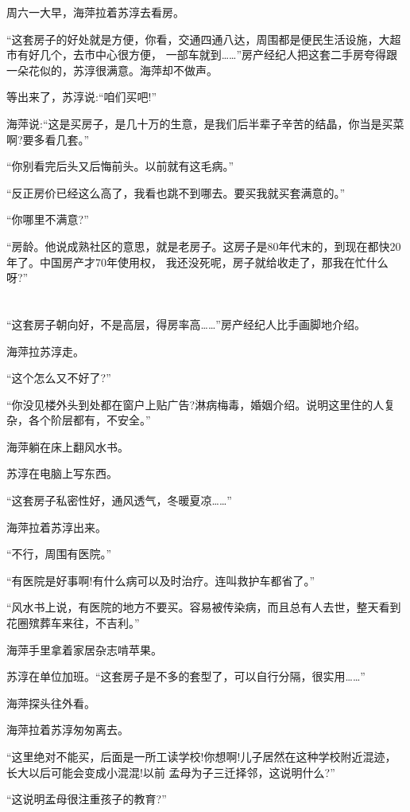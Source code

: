 \documentclass[11pt,a4paper,onecolumn]{article}
\begin{document}
周六一大早，海萍拉着苏淳去看房。

``这套房子的好处就是方便，你看，交通四通八达，周围都是便民生活设施，大超市有好几个，去市中心很方便，
一部车就到……''房产经纪人把这套二手房夸得跟一朵花似的，苏淳很满意。海萍却不做声。

等出来了，苏淳说:``咱们买吧!''

海萍说:``这是买房子，是几十万的生意，是我们后半辈子辛苦的结晶，你当是买菜啊?要多看几套。''

``你别看完后头又后悔前头。以前就有这毛病。''

``反正房价已经这么高了，我看也跳不到哪去。要买我就买套满意的。''

``你哪里不满意?''

``房龄。他说成熟社区的意思，就是老房子。这房子是80年代末的，到现在都快20年了。中国房产才70年使用权，
我还没死呢，房子就给收走了，那我在忙什么呀?''

\section[\thesection]{}

``这套房子朝向好，不是高层，得房率高……''房产经纪人比手画脚地介绍。

海萍拉苏淳走。

``这个怎么又不好了?''

``你没见楼外头到处都在窗户上贴广告?淋病梅毒，婚姻介绍。说明这里住的人复杂，各个阶层都有，不安全。''

海萍躺在床上翻风水书。

苏淳在电脑上写东西。

``这套房子私密性好，通风透气，冬暖夏凉……''

海萍拉着苏淳出来。

``不行，周围有医院。''

``有医院是好事啊!有什么病可以及时治疗。连叫救护车都省了。''

``风水书上说，有医院的地方不要买。容易被传染病，而且总有人去世，整天看到花圈殡葬车来往，不吉利。''

海萍手里拿着家居杂志啃苹果。

苏淳在单位加班。``这套房子是不多的套型了，可以自行分隔，很实用……''

海萍探头往外看。

海萍拉着苏淳匆匆离去。

``这里绝对不能买，后面是一所工读学校!你想啊!儿子居然在这种学校附近混迹，长大以后可能会变成小混混!以前
孟母为子三迁择邻，这说明什么?''

``这说明孟母很注重孩子的教育?''
\end{document}
